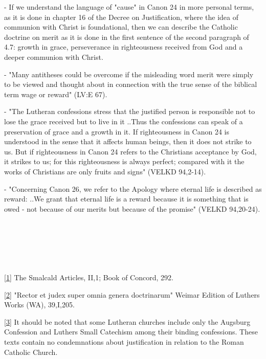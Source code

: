 - If we understand the language of "cause" in Canon 24 in more personal
terms, as it is done in chapter 16 of the Decree on Justification, where
the idea of communion with Christ is foundational, then we can describe
the Catholic doctrine on merit as it is done in the first sentence of
the second paragraph of 4.7: growth in grace, perseverance in
righteousness received from God and a deeper communion with Christ.

- "Many antitheses could be overcome if the misleading word
\textquotesingle merit\textquotesingle{} were simply to be viewed and
thought about in connection with the true sense of the biblical term
\textquotesingle wage\textquotesingle{} or reward" (LV:E 67).

- "The Lutheran confessions stress that the justified person is
responsible not to lose the grace received but to live in it ..Thus the
confessions can speak of a preservation of grace and a growth in it. If
righteousness in Canon 24 is understood in the sense that it affects
human beings, then it does not strike to us. But if
\textquotesingle righteousness\textquotesingle{} in Canon 24 refers to
the Christian\textquotesingle s acceptance by God, it strikes to us; for
this righteousness is always perfect; compared with it the works of
Christians are only \textquotesingle fruits\textquotesingle{} and
\textquotesingle signs\textquotesingle" (VELKD 94,2-14).

- "Concerning Canon 26, we refer to the Apology where eternal life is
described as reward: \textquotesingle..We grant that eternal life is a
reward because it is something that is owed - not because of our merits
but because of the promise\textquotesingle" (VELKD 94,20-24).

~

~

~

\hyperref[r1]{}\label{1}{}{[}\hyperref[r1]{1}{]} The
Smalcald Articles, II,1; Book of Concord, 292.

\hyperref[r2]{}\label{2}{}{[}\hyperref[r2]{2}{]} "Rector
et judex super omnia genera doctrinarum" Weimar Edition of
Luther\textquotesingle s Works (WA), 39,I,205.

\hyperref[r3]{}\label{3}{}{[}\hyperref[r3]{3}{]} It
should be noted that some Lutheran churches include only the Augsburg
Confession and Luther\textquotesingle s Small Catechism among their
binding confessions. These texts contain no condemnations about
justification in relation to the Roman Catholic Church.

